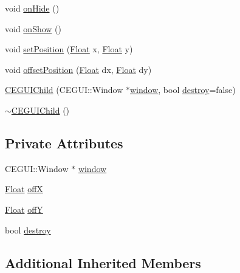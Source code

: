 \begin{DoxyCompactItemize}
\item 
void \hyperlink{classZeta_1_1CEGUIChild_ad7939c69d9fb86d146b446ec7c0bcd3d}{on\+Hide} ()
\item 
void \hyperlink{classZeta_1_1CEGUIChild_a348279ecf3a20fca40e5db481ec38487}{on\+Show} ()
\item 
void \hyperlink{classZeta_1_1CEGUIChild_abc0b4ebe7e8e822a2d56fbc30a2bca07}{set\+Position} (\hyperlink{namespaceZeta_a1e0a1265f9b3bd3075fb0fabd39088ba}{Float} x, \hyperlink{namespaceZeta_a1e0a1265f9b3bd3075fb0fabd39088ba}{Float} y)
\item 
void \hyperlink{classZeta_1_1CEGUIChild_a87c1f1fa12e40608b632628988e73f63}{offset\+Position} (\hyperlink{namespaceZeta_a1e0a1265f9b3bd3075fb0fabd39088ba}{Float} dx, \hyperlink{namespaceZeta_a1e0a1265f9b3bd3075fb0fabd39088ba}{Float} dy)
\item 
\hyperlink{classZeta_1_1CEGUIChild_aec3783c7454a938bc107443da2b743e7}{C\+E\+G\+U\+I\+Child} (C\+E\+G\+U\+I\+::\+Window $\ast$\hyperlink{classZeta_1_1CEGUIChild_a613512ccdd6b324a8a15e063b6a56fdd}{window}, bool \hyperlink{classZeta_1_1CEGUIChild_a048b0e5733cbe3e069a3f1e7787aa3c9}{destroy}=false)
\item 
\hyperlink{classZeta_1_1CEGUIChild_a52ef8ac3fe52fdd2e707e0fb38aea074}{$\sim$\+C\+E\+G\+U\+I\+Child} ()
\end{DoxyCompactItemize}
\subsection*{Private Attributes}
\begin{DoxyCompactItemize}
\item 
C\+E\+G\+U\+I\+::\+Window $\ast$ \hyperlink{classZeta_1_1CEGUIChild_a613512ccdd6b324a8a15e063b6a56fdd}{window}
\item 
\hyperlink{namespaceZeta_a1e0a1265f9b3bd3075fb0fabd39088ba}{Float} \hyperlink{classZeta_1_1CEGUIChild_ab310788932185a4617ad278b5c2191d4}{off\+X}
\item 
\hyperlink{namespaceZeta_a1e0a1265f9b3bd3075fb0fabd39088ba}{Float} \hyperlink{classZeta_1_1CEGUIChild_ad4f34c974859b029a4ccea381ba23fae}{off\+Y}
\item 
bool \hyperlink{classZeta_1_1CEGUIChild_a048b0e5733cbe3e069a3f1e7787aa3c9}{destroy}
\end{DoxyCompactItemize}
\subsection*{Additional Inherited Members}



